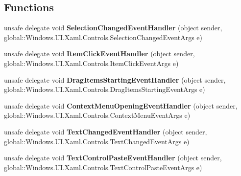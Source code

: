 \subsection*{Functions}
\begin{DoxyCompactItemize}
\item 
\mbox{\label{namespace_windows_1_1_u_i_1_1_xaml_1_1_controls_a1a649dc1bac179b73148182e2f1a1c64}} 
unsafe delegate void {\bfseries Selection\+Changed\+Event\+Handler} (object sender, global\+::\+Windows.\+U\+I.\+Xaml.\+Controls.\+Selection\+Changed\+Event\+Args e)
\item 
\mbox{\label{namespace_windows_1_1_u_i_1_1_xaml_1_1_controls_a764b3f040de8b594e480a65c032865ba}} 
unsafe delegate void {\bfseries Item\+Click\+Event\+Handler} (object sender, global\+::\+Windows.\+U\+I.\+Xaml.\+Controls.\+Item\+Click\+Event\+Args e)
\item 
\mbox{\label{namespace_windows_1_1_u_i_1_1_xaml_1_1_controls_a834d137e273b93f9f6fa3e85a5fed0f1}} 
unsafe delegate void {\bfseries Drag\+Items\+Starting\+Event\+Handler} (object sender, global\+::\+Windows.\+U\+I.\+Xaml.\+Controls.\+Drag\+Items\+Starting\+Event\+Args e)
\item 
\mbox{\label{namespace_windows_1_1_u_i_1_1_xaml_1_1_controls_a0356aa99480424070768f310da0b64a0}} 
unsafe delegate void {\bfseries Context\+Menu\+Opening\+Event\+Handler} (object sender, global\+::\+Windows.\+U\+I.\+Xaml.\+Controls.\+Context\+Menu\+Event\+Args e)
\item 
\mbox{\label{namespace_windows_1_1_u_i_1_1_xaml_1_1_controls_a9335b2700f16e55a0f6f1916a8434d02}} 
unsafe delegate void {\bfseries Text\+Changed\+Event\+Handler} (object sender, global\+::\+Windows.\+U\+I.\+Xaml.\+Controls.\+Text\+Changed\+Event\+Args e)
\item 
\mbox{\label{namespace_windows_1_1_u_i_1_1_xaml_1_1_controls_accdaa74c3b18d8e1dbf082d6aa703a02}} 
unsafe delegate void {\bfseries Text\+Control\+Paste\+Event\+Handler} (object sender, global\+::\+Windows.\+U\+I.\+Xaml.\+Controls.\+Text\+Control\+Paste\+Event\+Args e)

\end{DoxyCompactItemize}
